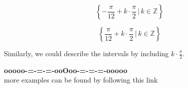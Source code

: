 \documentclass{ximera}
\begin{document}
\[
\left\{  -\frac{\pi}{12} + k  \cdot \frac{\pi}{2}  \, | \,  k \in \mathbb{Z}         \right\}
\]



\[
\left\{  \frac{\pi}{12} + k  \cdot \frac{\pi}{2}  \, | \,  k \in \mathbb{Z}         \right\}
\]




Similarly, we could describe the intervals by including $k  \cdot \frac{\pi}{2} $. \\


















\begin{center}
\textbf{\textcolor{green!50!black}{ooooo-=-=-=-ooOoo-=-=-=-ooooo}} \\

more examples can be found by following this link\\ 

\end{center}
\end{document}
